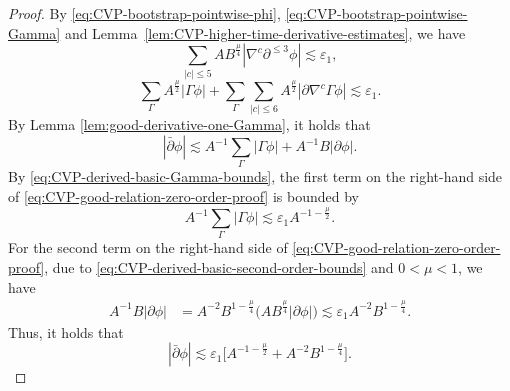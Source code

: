 \documentclass[11pt,twoside]{article}
\def\f{\frac}
\def\p{\partial}
\def\ve{\varepsilon}
\def\ls{\lesssim}
\theoremstyle{plain}
\theoremstyle{definition}
\theoremstyle{assumption}
\numberwithin{equation}{section}
\begin{document}
	\begin{proof}
		By
		\eqref{eq:CVP-bootstrap-pointwise-phi},
		\eqref{eq:CVP-bootstrap-pointwise-Gamma} and
		Lemma~\ref{lem:CVP-higher-time-derivative-estimates}, we have
		\begin{equation}
			\label{eq:CVP-derived-basic-second-order-bounds}
			\sum_{|c|\le 5}
			AB^{\f\mu4}
			|\nabla^c\p^{\le 3}\phi|
			\ls
			\ve_1,
		\end{equation}
		\begin{equation}
			\label{eq:CVP-derived-basic-Gamma-bounds}
			\sum_{\Gamma}
			A^{\frac{\mu}{2}}
			|\Gamma\phi|
			+
			\sum_{\Gamma}
			\sum_{|c|\le 6}
			A^{\frac{\mu}{2}}
			|\p\nabla^c\Gamma\phi|
			\ls
			\ve_1.
		\end{equation}
		By Lemma \ref{lem:good-derivative-one-Gamma}, it holds that
		\begin{equation}\label{eq:CVP-good-relation-zero-order-proof}
			|\bar{\p}\phi|
			\ls
			A^{-1}\sum_{\Gamma}
			|\Gamma\phi|
			+A^{-1}B|\p\phi|.
		\end{equation}
		By \eqref{eq:CVP-derived-basic-Gamma-bounds}, the first term on the right-hand side of \eqref{eq:CVP-good-relation-zero-order-proof}
is bounded by
\begin{equation}\label{YHC-22}
A^{-1}\sum_{\Gamma}|\Gamma\phi|\ls\ve_1A^{-1-\f\mu2}.
\end{equation}
		 For the second term on the right-hand side of \eqref{eq:CVP-good-relation-zero-order-proof}, due to
		\eqref{eq:CVP-derived-basic-second-order-bounds} and \(0<\mu<1\), we have
		\begin{equation}
			\label{eq:CVP-weighted-good-B-zero-order-proof}
			\begin{aligned}
				A^{-1}B|\p\phi|
				&=A^{-2}B^{1-\f\mu4}
				\big(AB^{\f\mu4}|\p\phi|\big)
				\ls\ve_1 A^{-2}	B^{1-\f\mu4}.
			\end{aligned}
		\end{equation}
		Thus, it holds that
		\begin{equation}\label{eq:CVP-derived-zero-order-good-final}
			|\bar{\p}\phi|
			\ls
			\ve_1\big[A^{-1-\f\mu2}
			+A^{-2}	B^{1-\f\mu4}\big].
		\end{equation}
		

\end{proof}
\end{document}

